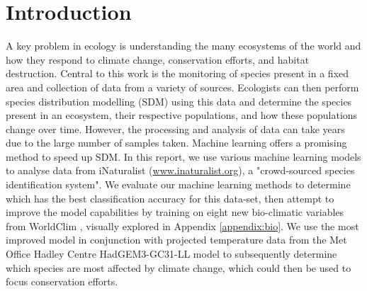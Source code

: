 \section{Introduction}
A key problem in ecology is understanding the many ecosystems of the world and how they respond to climate change, conservation efforts, and habitat destruction. Central to this work is the monitoring of species present in a fixed area and collection of data from a variety of sources. Ecologists can then perform species distribution modelling (SDM) using this data and determine the species present in an ecosystem, their respective populations, and how these populations change over time. However, the processing and analysis of data can take years due to the large number of samples taken. Machine learning offers a promising method to speed up SDM.
In this report, we use various machine learning models to analyse data from iNaturalist (\url{www.inaturalist.org}), a "crowd-sourced species identification system". We evaluate our machine learning methods to determine which has the best classification accuracy for this data-set, then attempt to improve the model capabilities by training on eight new bio-climatic variables from WorldClim \cite{worldclim}, visually explored in Appendix \ref{appendix:bio}. We use the most improved model in conjunction with projected temperature data from the Met Office Hadley Centre HadGEM3-GC31-LL model \cite{met} to subsequently determine which species are most affected by climate change, which could then be used to focus conservation efforts. 